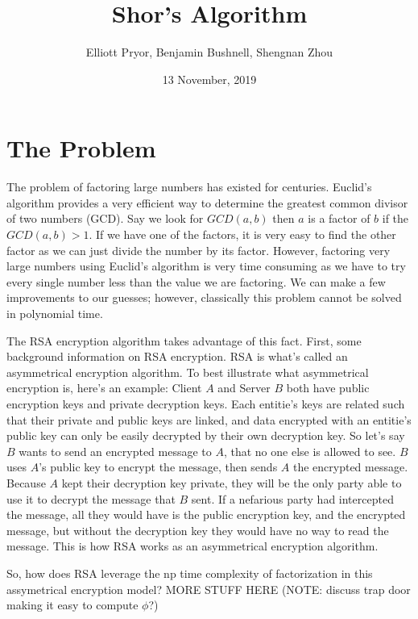 \documentclass[a4paper]{article}
\title{Shor's Algorithm}
\author{Elliott Pryor, Benjamin Bushnell, Shengnan Zhou}
\date{13 November, 2019}
\begin{document}
\maketitle %
\section{The Problem}
The problem of factoring large numbers has existed for centuries. Euclid's algorithm provides a very efficient way to determine the greatest common divisor of two numbers (GCD). Say we look for $GCD(a,b)$ then $a$ is a factor of $b$ if the $GCD(a, b) > 1$. If we have one of the factors, it is very easy to find the other factor as we can just divide the number by its factor. However, factoring very large numbers using Euclid's algorithm is very time consuming as we have to try every single number less than the value we are factoring. We can make a few improvements to our guesses; however, classically this problem cannot be solved in polynomial time.

The RSA encryption algorithm takes advantage of this fact. First, some background information on RSA encryption. RSA is what's called an asymmetrical encryption algorithm. To best illustrate what asymmetrical encryption is, here's an example: Client $A$ and Server $B$ both have public encryption keys and private decryption keys. Each entitie's keys are related such that their private and public keys are linked, and data encrypted with an entitie's public key can only be easily decrypted by their own decryption key. So let's say $B$ wants to send an encrypted message to $A$, that no one else is allowed to see. $B$ uses $A$'s public key to encrypt the message, then sends $A$ the encrypted message. Because $A$ kept their decryption key private, they will be the only party able to use it to decrypt the message that $B$ sent. If a nefarious party had intercepted the message, all they would have is the public encryption key, and the encrypted message, but without the decryption key they would have no way to read the message. This is how RSA works as an asymmetrical encryption algorithm.

So, how does RSA leverage the np time complexity of factorization in this assymetrical encryption model? MORE STUFF HERE (NOTE: discuss trap door making it easy to compute $\phi$?)
\end{document}
